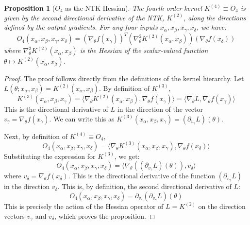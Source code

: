 \documentclass{article}
\newtheorem{proposition}[theorem]{Proposition}
\begin{document}
\begin{proposition}[$O_4$ as the NTK Hessian]
The fourth-order kernel $K^{(4)} \equiv O_4$ is given by the second directional derivative of the NTK, $K^{(2)}$, along the directions defined by the output gradients. For any four inputs $x_\alpha, x_\beta, x_\gamma, x_\delta$, we have:
\begin{equation}
O_4(x_\alpha, x_\beta, x_\gamma, x_\delta) = \left( \nabla_\theta f(x_\gamma) \right)^T \left( \nabla^2_\theta K^{(2)}(x_\alpha, x_\beta) \right) \left( \nabla_\theta f(x_\delta) \right)
\end{equation}
where $\nabla^2_\theta K^{(2)}(x_\alpha, x_\beta)$ is the Hessian of the scalar-valued function $\theta \mapsto K^{(2)}(x_\alpha, x_\beta)$.
\end{proposition}

\begin{proof}
The proof follows directly from the definitions of the kernel hierarchy. Let $L(\theta; x_\alpha, x_\beta) = K^{(2)}(x_\alpha, x_\beta)$.
By definition of $K^{(3)}$,
\begin{equation}
K^{(3)}(x_\alpha, x_\beta, x_\gamma) = \langle \nabla_\theta K^{(2)}(x_\alpha, x_\beta), \nabla_\theta f(x_\gamma) \rangle = \langle \nabla_\theta L, \nabla_\theta f(x_\gamma) \rangle
\end{equation}
This is the directional derivative of $L$ in the direction of the vector $v_\gamma = \nabla_\theta f(x_\gamma)$. We can write this as $K^{(3)}(x_\alpha, x_\beta, x_\gamma) = (\partial_{v_\gamma} L)(\theta)$.

Next, by definition of $K^{(4)} \equiv O_4$,
\begin{equation}
O_4(x_\alpha, x_\beta, x_\gamma, x_\delta) = \langle \nabla_\theta K^{(3)}(x_\alpha, x_\beta, x_\gamma), \nabla_\theta f(x_\delta) \rangle
\end{equation}
Substituting the expression for $K^{(3)}$, we get:
\begin{equation}
O_4(x_\alpha, x_\beta, x_\gamma, x_\delta) = \langle \nabla_\theta \left( (\partial_{v_\gamma} L)(\theta) \right), v_\delta \rangle
\end{equation}
where $v_\delta = \nabla_\theta f(x_\delta)$. This is the directional derivative of the function $(\partial_{v_\gamma} L)$ in the direction $v_\delta$. This is, by definition, the second directional derivative of $L$:
\begin{equation}
O_4(x_\alpha, x_\beta, x_\gamma, x_\delta) = \partial_{v_\delta} \left( \partial_{v_\gamma} L \right)(\theta)
\end{equation}
This is precisely the action of the Hessian operator of $L = K^{(2)}$ on the direction vectors $v_\gamma$ and $v_\delta$, which proves the proposition.
\end{proof}
\end{document}
